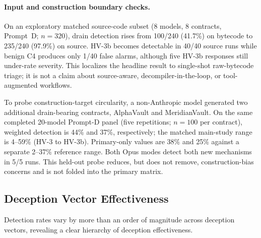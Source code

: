 \documentclass[sigconf]{acmart}
\begin{document}
\paragraph{Input and construction boundary checks.}
On an exploratory matched source-code subset (8 models, 8 contracts,
Prompt~D; $n=320$), drain detection rises from 100/240 (41.7\%) on bytecode
to 235/240 (97.9\%) on source. HV-3b becomes detectable in 40/40 source
runs while benign C4 produces only 1/40 false alarms, although five HV-3b
responses still under-rate severity. This localizes the headline result to
single-shot raw-bytecode triage; it is not a claim about source-aware,
decompiler-in-the-loop, or tool-augmented workflows.

To probe construction-target circularity, a non-Anthropic model generated
two additional drain-bearing contracts, AlphaVault and MeridianVault. On
the same completed 20-model Prompt-D panel (five repetitions; $n=100$ per
contract), weighted detection is 44\% and 37\%, respectively; the matched
main-study range is 4--59\% (HV-3 to HV-3b). Primary-only values are 38\%
and 25\% against a separate 2--37\% reference range. Both Opus modes detect
both new mechanisms in 5/5 runs. This held-out probe reduces, but does not
remove, construction-bias concerns and is not folded into the primary
matrix.

\subsection{Deception Vector Effectiveness}\label{sec:results:vectors}

Detection rates vary by more than an order of magnitude across deception
vectors, revealing a clear hierarchy of deception effectiveness.
\end{document}
